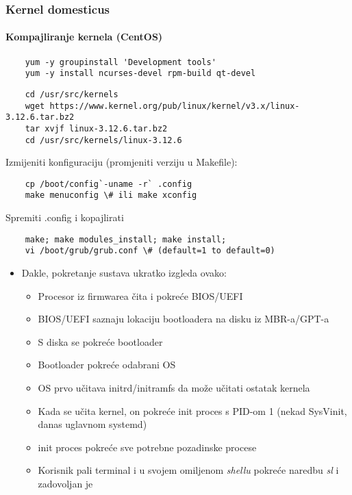 \documentclass[t]{beamer}
\begin{document}
\begin{frame}[fragile]
	\frametitle{Kernel domesticus}
	\framesubtitle{Kompajliranje kernela (CentOS)}
    \footnotesize
    \begin{verbatim}
	yum -y groupinstall 'Development tools'
	yum -y install ncurses-devel rpm-build qt-devel
	\end{verbatim}
	\begin{verbatim}
	cd /usr/src/kernels
	wget https://www.kernel.org/pub/linux/kernel/v3.x/linux-3.12.6.tar.bz2
	tar xvjf linux-3.12.6.tar.bz2
	cd /usr/src/kernels/linux-3.12.6
	\end{verbatim}
	Izmijeniti konfiguraciju (promjeniti verziju u Makefile):
	\begin{verbatim}
	cp /boot/config`-uname -r` .config
	make menuconfig \# ili make xconfig
	\end{verbatim}
	Spremiti .config i kopajlirati
	\begin{verbatim}
	make; make modules_install; make install;
	vi /boot/grub/grub.conf \# (default=1 to default=0)
	\end{verbatim}
\end{frame}

\begin{frame}
	\begin{itemize}
		\item Dakle, pokretanje sustava ukratko izgleda ovako:
		\begin{itemize}
			\item Procesor iz firmwarea čita i pokreće BIOS/UEFI
			\item BIOS/UEFI saznaju lokaciju bootloadera na disku iz MBR-a/GPT-a
			\item S diska se pokreće bootloader
			\item Bootloader pokreće odabrani OS
			\item OS prvo učitava initrd/initramfs da može učitati ostatak kernela
			\item Kada se učita kernel, on pokreće init proces s PID-om 1 (nekad SysVinit, danas uglavnom systemd)
			\item init proces pokreće sve potrebne pozadinske procese
			\item Korisnik pali terminal i u svojem omiljenom \textit{shellu} pokreće naredbu \textit{sl} i zadovoljan je
		\end{itemize}
	\end{itemize}
\end{frame}
\end{document}
